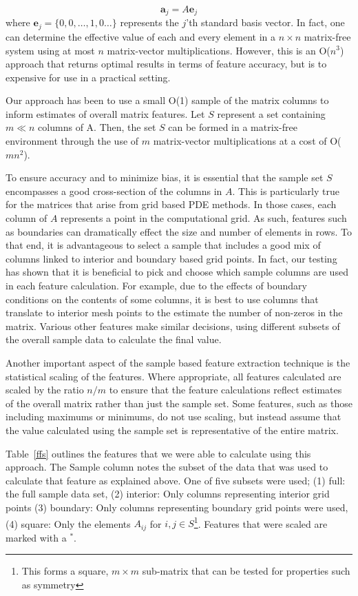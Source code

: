 \[ \mathbf{a}_j = A \mathbf{e}_j \] where $\mathbf{e}_j = \{0,0,\dots,1,0\dots\}$ represents the $j$'th standard basis vector. In fact, one can determine the effective value of each and every element in a $n \times n$ matrix-free system using at most $n$ matrix-vector multiplications. However, this is an O($n^3$) approach that returns optimal results in terms of feature accuracy, but is to expensive for use in a practical setting.

Our approach has been to use a small O(1) sample of the matrix columns to inform estimates of overall matrix features. Let $S$ represent a set containing $m \ll n $ columns of A. Then, the set $S$ can be formed in a matrix-free environment through the use of $m$ matrix-vector multiplications at a cost of O($mn^2$).  

To ensure accuracy and to minimize bias, it is essential that the sample set $S$ encompasses a good cross-section of the columns in $A$. This is particularly true for the matrices that arise from grid based PDE methods. In those cases, each column of $A$ represents a point in the computational grid. As such, features such as boundaries can dramatically effect the size and number of elements in rows. To that end, it is advantageous to select a sample that includes a good mix of columns linked to interior and boundary based grid points. In fact, our testing has shown that it is beneficial to pick and choose which sample columns are used in each feature calculation. For example, due to the effects of boundary conditions on the contents of some columns, it is best to use columns that translate to interior mesh points to the estimate the number of non-zeros in the matrix. Various other features make similar decisions, using different subsets of the overall sample data to calculate the final value.

Another important aspect of the sample based feature extraction technique is the statistical scaling of the features. Where appropriate, all features calculated are scaled by the ratio $n/m$ to ensure that the feature calculations reflect estimates of the overall matrix rather than just the sample set. Some features, such as those including maximums or minimums, do not use scaling, but instead assume that the value calculated using the sample set is representative of the entire matrix.   

Table~\ref{ffs} outlines the features that we were able to calculate using this approach. The Sample column notes the subset of the data that was used to calculate that feature as explained above. One of five subsets were used; (1) full: the full sample data set, (2) interior: Only columns representing interior grid points (3) boundary: Only columns representing boundary grid points were used, (4) square: Only the elements $A_{ij}$ for ${i,j} \in S$\footnote{This forms a square, $m\times m$ sub-matrix that can be tested for properties such as symmetry}.  Features that were scaled are marked with a $^*$.



